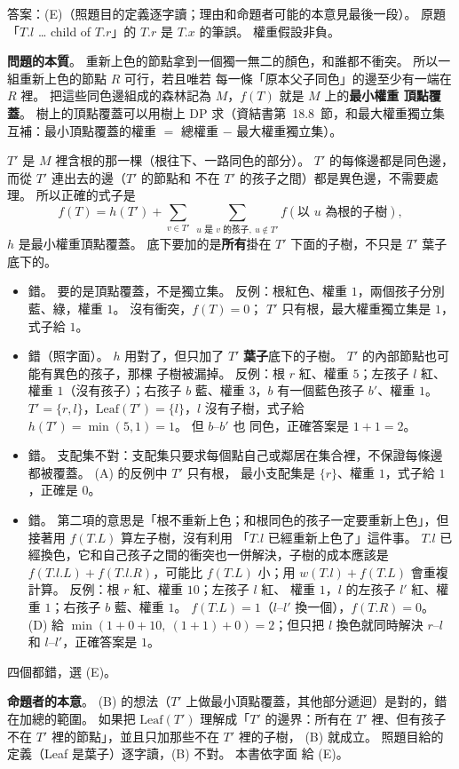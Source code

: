 \begin{pastsoln}
答案：(E)（照題目的定義逐字讀；理由和命題者可能的本意見最後一段）。 原題「$T.l$ … child of $T.r$」的 $T.r$ 是 $T.x$
的筆誤。 權重假設非負。

\textbf{問題的本質}。 重新上色的節點拿到一個獨一無二的顏色，和誰都不衝突。 所以一組重新上色的節點 $R$ 可行，若且唯若
每一條「原本父子同色」的邊至少有一端在 $R$ 裡。 把這些同色邊組成的森林記為 $M$，$f(T)$ 就是 $M$ 上的\textbf{最小權重
頂點覆蓋}。 樹上的頂點覆蓋可以用樹上 DP 求（資結書第~18.8~節，和最大權重獨立集互補：最小頂點覆蓋的權重 $=$
總權重 $-$ 最大權重獨立集）。

$T'$ 是 $M$ 裡含根的那一棵（根往下、一路同色的部分）。 $T'$ 的每條邊都是同色邊，而從 $T'$ 連出去的邊（$T'$ 的節點和
不在 $T'$ 的孩子之間）都是異色邊，不需要處理。 所以正確的式子是
\[
f(T) = h(T') + \sum_{v \in T'}\ \sum_{u \text{ 是 } v \text{ 的孩子},\ u \notin T'} f(\text{以 } u \text{ 為根的子樹}),
\]
$h$ 是最小權重頂點覆蓋。 底下要加的是\textbf{所有}掛在 $T'$ 下面的子樹，不只是 $T'$ 葉子底下的。

\begin{itemize}
\item[(A)] 錯。 要的是頂點覆蓋，不是獨立集。 反例：根紅色、權重 $1$，兩個孩子分別藍、綠，權重 $1$。 沒有衝突，$f(T) = 0$；
$T'$ 只有根，最大權重獨立集是 $1$，式子給 $1$。
\item[(B)] 錯（照字面）。 $h$ 用對了，但只加了 $T'$ \textbf{葉子}底下的子樹。 $T'$ 的內部節點也可能有異色的孩子，那棵
子樹被漏掉。 反例：根 $r$ 紅、權重 $5$；左孩子 $l$ 紅、權重 $1$（沒有孩子）；右孩子 $b$ 藍、權重 $3$，$b$ 有一個藍色孩子
$b'$、權重 $1$。 $T' = \{r, l\}$，$\mathrm{Leaf}(T') = \{l\}$，$l$ 沒有子樹，式子給 $h(T') = \min(5, 1) = 1$。 但 $b$--$b'$ 也
同色，正確答案是 $1 + 1 = 2$。
\item[(C)] 錯。 支配集不對：支配集只要求每個點自己或鄰居在集合裡，不保證每條邊都被覆蓋。 (A) 的反例中 $T'$ 只有根，
最小支配集是 $\{r\}$、權重 $1$，式子給 $1$，正確是 $0$。
\item[(D)] 錯。 第二項的意思是「根不重新上色；和根同色的孩子一定要重新上色」，但接著用 $f(T.L)$ 算左子樹，沒有利用
「$T.l$ 已經重新上色了」這件事。 $T.l$ 已經換色，它和自己孩子之間的衝突也一併解決，子樹的成本應該是
$f(T.l.L) + f(T.l.R)$，可能比 $f(T.L)$ 小；用 $w(T.l) + f(T.L)$ 會重複計算。 反例：根 $r$ 紅、權重 $10$；左孩子 $l$ 紅、
權重 $1$，$l$ 的左孩子 $l'$ 紅、權重 $1$；右孩子 $b$ 藍、權重 $1$。 $f(T.L) = 1$（$l$--$l'$ 換一個），$f(T.R) = 0$。
(D) 給 $\min(1 + 0 + 10,\ (1 + 1) + 0) = 2$；但只把 $l$ 換色就同時解決 $r$--$l$ 和 $l$--$l'$，正確答案是 $1$。
\end{itemize}
四個都錯，選 (E)。

\textbf{命題者的本意}。 (B) 的想法（$T'$ 上做最小頂點覆蓋，其他部分遞迴）是對的，錯在加總的範圍。 如果把
$\mathrm{Leaf}(T')$ 理解成「$T'$ 的邊界：所有在 $T'$ 裡、但有孩子不在 $T'$ 裡的節點」，並且只加那些不在 $T'$ 裡的子樹，
(B) 就成立。 照題目給的定義（Leaf 是葉子）逐字讀，(B) 不對。 本書依字面
給 (E)。
\end{pastsoln}
